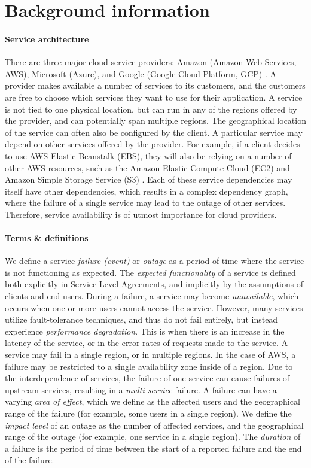 \section{Background information}
\paragraph{Service architecture}
There are three major cloud service providers: Amazon (Amazon Web Services, AWS), Microsoft (Azure), and Google (Google Cloud Platform, GCP) \cite{dignan2020, jones2020}.
A provider makes available a number of services to its customers, and the customers are free to choose which services they want to use for their application.
A service is not tied to one physical location, but can run in any of the regions offered by the provider, and can potentially span multiple regions.
The geographical location of the service can often also be configured by the client.
A particular service may depend on other services offered by the provider.
For example, if a client decides to use AWS Elastic Beanstalk (EBS), they will also be relying on a number of other AWS resources, such as the Amazon Elastic Compute Cloud (EC2) and Amazon Simple Storage Service (S3) \cite{awsFaq}.
Each of these service dependencies may itself have other dependencies, which results in a complex dependency graph, where the failure of a single service may lead to the outage of other services.
Therefore, service availability is of utmost importance for cloud providers.

\paragraph{Terms \& definitions}
We define a service \textit{failure (event)} or \textit{outage} as a period of time where the service is not functioning as expected.
The \textit{expected functionality} of a service is defined both explicitly in Service Level Agreements, and implicitly by the assumptions of clients and end users.
During a failure, a service may become \textit{unavailable}, which occurs when one or more users cannot access the service.
However, many services utilize fault-tolerance techniques, and thus do not fail entirely, but instead experience \textit{performance degradation}.
This is when there is an increase in the latency of the service, or in the error rates of requests made to the service.
A service may fail in a single region, or in multiple regions.
In the case of AWS, a failure may be restricted to a single availability zone inside of a region.
Due to the interdependence of services, the failure of one service can cause failures of upstream services, resulting in a \textit{multi-service} failure.
A failure can have a varying \textit{area of effect}, which we define as the affected users and the geographical range of the failure (for example, some users in a single region).
We define the \textit{impact level} of an outage as the number of affected services, and the geographical range of the outage (for example, one service in a single region).
The \textit{duration} of a failure is the period of time between the start of a reported failure and the end of the failure.
